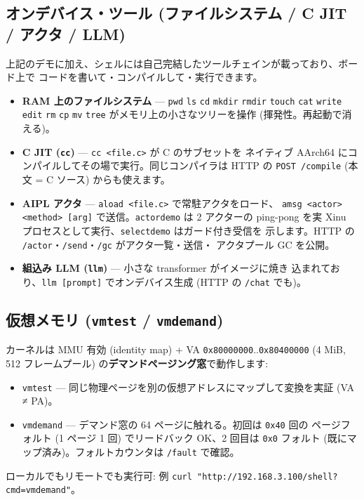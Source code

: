 \documentclass[a4paper,11pt]{ltjsarticle}
\begin{document}
\subsection{オンデバイス・ツール (ファイルシステム / C JIT / アクタ / LLM)}
上記のデモに加え、シェルには自己完結したツールチェインが載っており、ボード上で
コードを書いて・コンパイルして・実行できます。
\begin{itemize}[leftmargin=1.4em,itemsep=1pt]
\item \textbf{RAM 上のファイルシステム} --- \verb|pwd| \verb|ls| \verb|cd|
  \verb|mkdir| \verb|rmdir| \verb|touch| \verb|cat| \verb|write| \verb|edit|
  \verb|rm| \verb|cp| \verb|mv| \verb|tree| がメモリ上の小さなツリーを操作
  (揮発性。再起動で消える)。
\item \textbf{C JIT (\texttt{cc})} --- \verb|cc <file.c>| が C のサブセットを
  ネイティブ AArch64 にコンパイルしてその場で実行。同じコンパイラは HTTP の
  \verb|POST /compile| (本文 = C ソース) からも使えます。
\item \textbf{AIPL アクタ} --- \verb|aload <file.c>| で常駐アクタをロード、
  \verb|amsg <actor> <method> [arg]| で送信。\verb|actordemo| は 2 アクターの
  ping-pong を実 Xinu プロセスとして実行、\verb|selectdemo| はガード付き受信を
  示します。HTTP の \verb|/actor|・\verb|/send|・\verb|/gc| がアクタ一覧・送信・
  アクタプール GC を公開。
\item \textbf{組込み LLM (\texttt{llm})} --- 小さな transformer がイメージに焼き
  込まれており、\verb|llm [prompt]| でオンデバイス生成 (HTTP の \verb|/chat| でも)。
\end{itemize}

\subsection{仮想メモリ (\texttt{vmtest} / \texttt{vmdemand})}
カーネルは MMU 有効 (identity map) + VA \verb|0x80000000|..\verb|0x80400000|
(4 MiB, 512 フレームプール) の\textbf{デマンドページング窓}で動作します:
\begin{itemize}[leftmargin=1.4em,itemsep=1pt]
\item \verb|vmtest| --- 同じ物理ページを別の仮想アドレスにマップして変換を実証
  (VA ≠ PA)。
\item \verb|vmdemand| --- デマンド窓の 64 ページに触れる。初回は \verb|0x40| 回の
  ページフォルト (1 ページ 1 回) でリードバック OK、2 回目は \verb|0x0| フォルト
  (既にマップ済み)。フォルトカウンタは \verb|/fault| で確認。
\end{itemize}
ローカルでもリモートでも実行可: 例
\verb|curl "http://192.168.3.100/shell?cmd=vmdemand"|。
\end{document}
